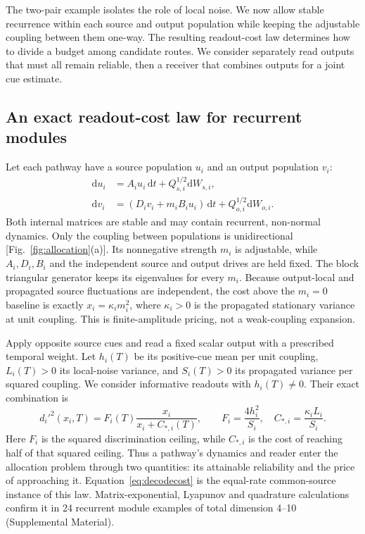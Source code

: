 \documentclass[aps,10pt,onecolumn,superscriptaddress,nofootinbib,longbibliography,
  amsmath,amssymb,floatfix]{revtex4-2}
\newcommand{\dd}{\mathrm{d}}
\begin{document}
The two-pair example isolates the role of local noise. We now allow
stable recurrence within each source and output population while
keeping the adjustable coupling between them one-way. The resulting
readout-cost law determines how to divide a budget among candidate
routes. We consider separately read outputs that must all remain
reliable, then a receiver that combines outputs for a joint cue
estimate.

\subsection{An exact readout-cost law for recurrent modules}

Let each pathway have a source population \(u_i\) and an output
population \(v_i\):
\begin{equation}
 \begin{aligned}
 \dd u_i&=A_i u_i\,\dd t+Q_{s,i}^{1/2}\dd W_{s,i},\\
 \dd v_i&=(D_i v_i+m_i B_i u_i)\,\dd t
                         +Q_{o,i}^{1/2}\dd W_{o,i}.
 \end{aligned}
 \label{eq:modules}
\end{equation}
Both internal matrices are stable and may contain recurrent,
non-normal dynamics. Only the coupling between populations is
unidirectional [Fig.~\ref{fig:allocation}(a)]. Its nonnegative
strength \(m_i\) is adjustable, while \(A_i,D_i,B_i\) and the
independent source and output drives are held fixed. The block
triangular generator keeps its eigenvalues for every \(m_i\).
Because output-local and propagated source fluctuations are
independent, the cost above the \(m_i=0\) baseline is exactly
\(x_i=\kappa_i m_i^2\), where \(\kappa_i>0\) is the propagated
stationary variance at unit coupling. This is finite-amplitude
pricing, not a weak-coupling expansion.

Apply opposite source cues and read a fixed scalar output with
a prescribed temporal weight. Let \(h_i(T)\) be its positive-cue
mean per unit coupling, \(L_i(T)>0\) its local-noise variance,
and \(S_i(T)>0\) its propagated variance per squared coupling.
We consider informative readouts with \(h_i(T)\ne0\).
Their exact combination is
\begin{equation}
 d_i'^2(x_i,T)=F_i(T)\frac{x_i}{x_i+C_{*,i}(T)},\qquad
 F_i=\frac{4h_i^2}{S_i},\quad
 C_{*,i}=\frac{\kappa_i L_i}{S_i}.
 \label{eq:modularlaw}
\end{equation}
Here \(F_i\) is the squared discrimination ceiling, while
\(C_{*,i}\) is the cost of reaching half of that squared ceiling.
Thus a pathway's dynamics and reader enter the allocation problem
through two quantities: its attainable reliability and the price
of approaching it. Equation~\eqref{eq:decodecost} is the
equal-rate common-source instance of this law. Matrix-exponential,
Lyapunov and quadrature calculations confirm it in 24 recurrent
module examples of total dimension 4--10 (Supplemental Material).
\end{document}
